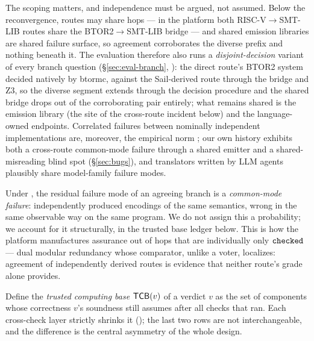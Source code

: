 The scoping matters, and independence must be argued, not assumed. Below
the reconvergence, routes may share hops --- in the platform both
RISC-V$\to$SMT-LIB routes share the BTOR2$\to$SMT-LIB bridge --- and
shared emission libraries are shared failure surface, so agreement
corroborates the diverse prefix and nothing beneath it. The evaluation
therefore also runs a \emph{disjoint-decision} variant of every branch
question (\S\ref{sec:eval-branch}, ): the direct route's BTOR2 system
decided natively by btormc, against the Sail-derived route through the
bridge and Z3, so the diverse segment extends through the decision
procedure and the shared bridge drops out of the corroborating pair
entirely; what remains shared is the emission library (the site of the
cross-route incident below) and the language-owned endpoints. Correlated
failures between nominally independent implementations are, moreover,
the empirical norm \citep{knight1986independence}; our own history
exhibits both a cross-route common-mode failure through a shared emitter
and a shared-misreading blind spot (\S\ref{sec:bugs}), and translators
written by LLM agents plausibly share model-family failure modes.

Under , the residual failure mode of an agreeing
branch is a \emph{common-mode failure}: independently produced encodings
of the same semantics, wrong in the same observable way on the same
program. We do not assign this a probability; we account for it
structurally, in the trusted base ledger below. This is how the platform
manufactures assurance out of hops that are individually only
$\mathtt{checked}$ --- dual modular redundancy whose comparator, unlike a voter,
localizes: agreement of independently derived routes is evidence that
neither route's grade alone provides.

\label{sec:tcb}

Define the \emph{trusted computing base} $\mathsf{TCB}(v)$ of a verdict $v$ as
the set of components whose correctness $v$'s soundness still assumes
after all checks that ran. Each cross-check layer strictly shrinks it
(); the last two rows are not interchangeable, and the
difference is the central asymmetry of the whole design.


